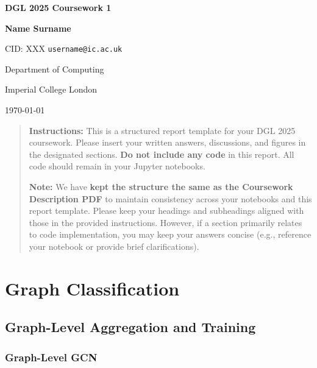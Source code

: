 \documentclass[a4paper,12pt]{article}
\begin{document}
\begin{titlepage}
    \centering
    {\Huge\bfseries DGL 2025 Coursework 1 \par}
    \vspace{1.5cm}
    {\Large\bfseries Name Surname \par}
    \vspace{0.5cm}
    {\large CID: XXX \quad \texttt{username@ic.ac.uk} \par}
    \vspace{1.5cm}
    {\large Department of Computing \par}
    {\large Imperial College London \par}
    \vfill
    {\large \today \par}
\end{titlepage}


\begin{abstract}
\noindent\textbf{Instructions:} This is a structured report template for your DGL 2025 coursework. Please insert your written answers, discussions, and figures in the designated sections. \textbf{Do not include any code} in this report. All code should remain in your Jupyter notebooks.

\noindent\textbf{Note:} We have \textbf{kept the structure the same as the Coursework Description PDF} to maintain consistency across your notebooks and this report template. Please keep your headings and subheadings aligned with those in the provided instructions. However, if a section primarily relates to code implementation, you may keep your answers concise (e.g., reference your notebook or provide brief clarifications).
\end{abstract}

\newpage


\section{Graph Classification}\label{sec:graph-classification}

\subsection{Graph-Level Aggregation and Training}
\subsubsection{Graph-Level GCN}
\end{document}
